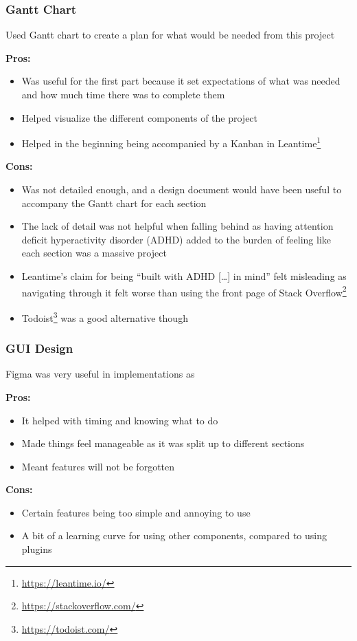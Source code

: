\documentclass[../dissertation.tex]{subfiles}
\begin{document}
\subsubsection{Gantt Chart}
Used Gantt chart to create a plan for what would be needed from this project

\textbf{Pros:}
\begin{itemize}
  \item Was useful for the first part because it set expectations
    of what was needed and how much time there was to complete them
  \item Helped visualize the different components of the project
  \item Helped in the beginning being accompanied by a Kanban in Leantime\footnote{\url{https://leantime.io/}}
\end{itemize}

\textbf{Cons:}
\begin{itemize}
  \item Was not detailed enough, and a design document would have been useful
    to accompany the Gantt chart for each section
  \item The lack of detail was not helpful when falling behind as having
    attention deficit hyperactivity disorder (ADHD) 
    added to the burden of feeling like each section was a massive project
  \item Leantime's claim for being \enquote{built with ADHD [\ldots] in mind}
    felt misleading as navigating through it felt worse than using the front page
    of Stack Overflow\footnote{\url{https://stackoverflow.com/}}
  \item Todoist\footnote{\url{https://todoist.com/}} was a good alternative though
\end{itemize}

\subsubsection{GUI Design}
Figma was very useful in implementations as

\textbf{Pros:}
\begin{itemize}
  \item It helped with timing and knowing what to do
  \item Made things feel manageable as it was split up to different sections
  \item Meant features will not be forgotten
\end{itemize}

\textbf{Cons:}
\begin{itemize}
  \item Certain features being too simple and annoying to use
  \item A bit of a learning curve for using other components, compared
    to using plugins
\end{itemize}
\end{document}
